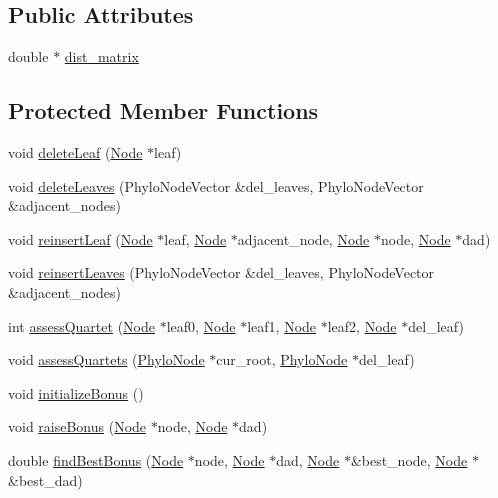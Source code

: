 \subsection*{Public Attributes}
\begin{DoxyCompactItemize}
\item 
double $\ast$ \hyperlink{classIQPTree_a48c7ed5f847b021180e600b1d779c8cb}{dist\_\-matrix}
\end{DoxyCompactItemize}
\subsection*{Protected Member Functions}
\begin{DoxyCompactItemize}
\item 
void \hyperlink{classIQPTree_a2e7b8c974f3d42a09bf652e8683d79f1}{deleteLeaf} (\hyperlink{classNode}{Node} $\ast$leaf)
\item 
void \hyperlink{classIQPTree_a038522be23c6a8fef71a2a1ffa983976}{deleteLeaves} (PhyloNodeVector \&del\_\-leaves, PhyloNodeVector \&adjacent\_\-nodes)
\item 
void \hyperlink{classIQPTree_ad6adbd783583faa754deb9c6d15eb93f}{reinsertLeaf} (\hyperlink{classNode}{Node} $\ast$leaf, \hyperlink{classNode}{Node} $\ast$adjacent\_\-node, \hyperlink{classNode}{Node} $\ast$node, \hyperlink{classNode}{Node} $\ast$dad)
\item 
void \hyperlink{classIQPTree_a803d8f087733ff4c7d4b400c87b35cea}{reinsertLeaves} (PhyloNodeVector \&del\_\-leaves, PhyloNodeVector \&adjacent\_\-nodes)
\item 
int \hyperlink{classIQPTree_ac33ea4963fb4d0ae1ba3e9df424aa7bc}{assessQuartet} (\hyperlink{classNode}{Node} $\ast$leaf0, \hyperlink{classNode}{Node} $\ast$leaf1, \hyperlink{classNode}{Node} $\ast$leaf2, \hyperlink{classNode}{Node} $\ast$del\_\-leaf)
\item 
void \hyperlink{classIQPTree_a5d319c525a15c21f9956fcae5e9d0884}{assessQuartets} (\hyperlink{classPhyloNode}{PhyloNode} $\ast$cur\_\-root, \hyperlink{classPhyloNode}{PhyloNode} $\ast$del\_\-leaf)
\item 
void \hyperlink{classIQPTree_ad617c01926a2efbdf1c64b025edddccc}{initializeBonus} ()
\item 
void \hyperlink{classIQPTree_a72733c572a34fce5483d9c58fddc54d1}{raiseBonus} (\hyperlink{classNode}{Node} $\ast$node, \hyperlink{classNode}{Node} $\ast$dad)
\item 
double \hyperlink{classIQPTree_a96cbd6e8fa106324e176fa15c6c7e77a}{findBestBonus} (\hyperlink{classNode}{Node} $\ast$node, \hyperlink{classNode}{Node} $\ast$dad, \hyperlink{classNode}{Node} $\ast$\&best\_\-node, \hyperlink{classNode}{Node} $\ast$\&best\_\-dad)
\end{DoxyCompactItemize}
